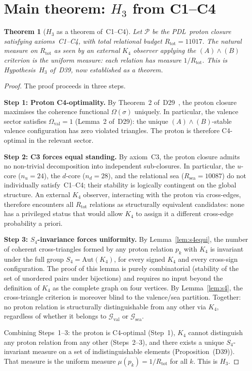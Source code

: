 \documentclass[11pt,a4paper]{article}
\theoremstyle{plain}
\newtheorem{theorem}{Theorem}[section]
\theoremstyle{definition}
\theoremstyle{remark}
\newcommand{\PDL}{\textnormal{PDL}}
\newcommand{\Kfour}{K_4}
\newcommand{\Rtot}{R_{\mathrm{tot}}}
\newcommand{\Rsea}{R_{\mathrm{sea}}}
\begin{document}
\section{Main theorem: \texorpdfstring{$H_3$}{H3} from C1--C4}
\label{sec:theorem}

\begin{theorem}[$H_3$ as a theorem of~C1--C4]
\label{thm:H3}
Let $\mathcal{P}$ be the \PDL\ proton closure satisfying axioms~C1--C4, with total relational budget $\Rtot = 11017$. The natural measure on $\Rtot$ as seen by an external $\Kfour$ observer applying the $(A)\wedge(B)$ criterion is the uniform measure: each relation has measure $1/\Rtot$. This is Hypothesis~$H_3$ of~D39, now established as a theorem.
\end{theorem}

\begin{proof}
The proof proceeds in three steps.

\textbf{Step 1: Proton C4-optimality.} By Theorem~2 of~D29~\cite{PDL_D29_2026}, the proton closure maximises the coherence functional $\Omega(\sigma)$ uniquely. In particular, the valence sector satisfies $\Omega_{\mathrm{val}} = 1$ (Lemma~2 of~D29): the unique $(A)\wedge(B)$-stable valence configuration has zero violated triangles. The proton is therefore C4-optimal in the relevant sector.

\textbf{Step 2: C3 forces equal standing.} By axiom~C3, the proton closure admits no non-trivial decomposition into independent sub-closures. In particular, the $u$-core ($n_u = 24$), the $d$-core ($n_d = 28$), and the relational sea ($\Rsea = 10087$) do not individually satisfy~C1--C4; their stability is logically contingent on the global structure. An external $\Kfour$ observer, interacting with the proton via cross-edges, therefore encounters all $\Rtot$ relations as structurally equivalent candidates: none has a privileged status that would allow $\Kfour$ to assign it a different cross-edge probability a priori.

\textbf{Step 3: $S_4$-invariance forces uniformity.} By Lemma~\ref{lem:s4equi}, the number of coherent cross-triangles formed by any proton relation $p_k$ with $\Kfour$ is invariant under the full group $S_4 = \mathrm{Aut}(\Kfour)$, for every signed $\Kfour$ and every cross-sign configuration. The proof of this lemma is purely combinatorial (stability of the set of unordered pairs under bijections) and requires no input beyond the definition of $\Kfour$ as the complete graph on four vertices. By Lemma~\ref{lem:s4}, the cross-triangle criterion is moreover blind to the valence/sea partition. Together: no proton relation is structurally distinguishable from any other via $\Kfour$, regardless of whether it belongs to $\mathcal{G}_{\mathrm{val}}$ or $\mathcal{G}_{\mathrm{sea}}$.

Combining Steps~1--3: the proton is C4-optimal (Step~1), $\Kfour$ cannot distinguish any proton relation from any other (Steps~2--3), and there exists a unique $S_4$-invariant measure on a set of indistinguishable elements (Proposition~(D39)). That measure is the uniform measure $\mu(p_k) = 1/\Rtot$ for all $k$. This is $H_3$.
\end{proof}
\end{document}
